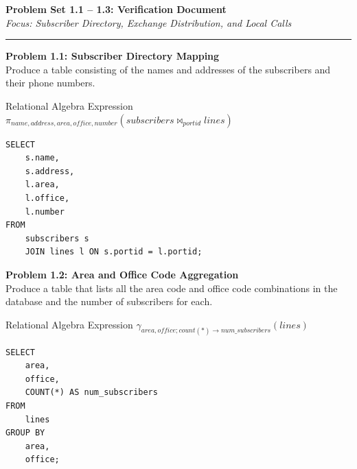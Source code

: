 \documentclass[12pt, addpoints, answers]{exam}
\begin{document}
\begin{center}
    {\LARGE \textbf{Problem Set 1.1 -- 1.3: Verification Document}} \\
    \vspace{0.5em}
    \textit{Focus: Subscriber Directory, Exchange Distribution, and Local Calls} \\
    \vspace{1em}
    \hrule
    \vspace{1em}
\end{center}
\thispagestyle{empty}

\begin{questions}

\question \textbf{Problem 1.1: Subscriber Directory Mapping} \\
Produce a table consisting of the names and addresses of the subscribers and their phone numbers.

\begin{raguery}{Relational Algebra Expression}
    $\pi_{name, address, area, office, number}(subscribers \bowtie_{portid} lines)$
\end{raguery}

\begin{solution}
\begin{lstlisting}
SELECT
    s.name,
    s.address,
    l.area,
    l.office,
    l.number
FROM
    subscribers s
    JOIN lines l ON s.portid = l.portid;
\end{lstlisting}
\end{solution}

\vspace{1em}

\question \textbf{Problem 1.2: Area and Office Code Aggregation} \\
Produce a table that lists all the area code and office code combinations in the database and the number of subscribers for each.

\begin{raguery}{Relational Algebra Expression}
    $\gamma_{area, office; count(*) \to num\_subscribers}(lines)$
\end{raguery}

\begin{solution}
\begin{lstlisting}
SELECT
    area,
    office,
    COUNT(*) AS num_subscribers
FROM
    lines
GROUP BY
    area,
    office;
\end{lstlisting}
\end{solution}


\end{questions}
\end{document}
